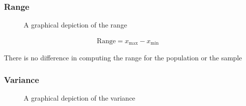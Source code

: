 \documentclass[
  a4paper,
]{scrbook}
\begin{document}
\subsubsection{Range}\label{range}

\begin{figure}[ht]


\caption{\label{fig-range-ds}A graphical depiction of the range}

\end{figure}%

\begin{align}
\text{Range} = x_{\text{max}} - x_{\text{min}}
\end{align}

There is no difference in computing the range for the population or the
sample

\subsubsection{Variance}\label{variance}

\begin{figure}[ht]


\caption{\label{fig-variance-ds}A graphical depiction of the variance}

\end{figure}%
\end{document}
